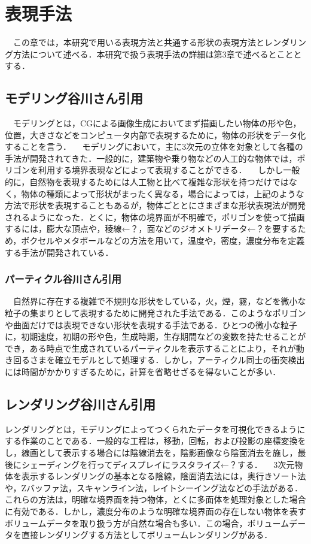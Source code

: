 \documentclass[11pt]{jreport}
\begin{document}
\chapter{表現手法}
　この章では，本研究で用いる表現方法と共通する形状の表現方法とレンダリング方法について述べる．本研究で扱う表現手法の詳細は第3章で述べるとこととする．

\section{モデリング谷川さん引用}
　モデリングとは，CGによる画像生成においてまず描画したい物体の形や色，位置，大きさなどをコンピュータ内部で表現するために，物体の形状をデータ化することを言う．
　モデリングにおいて，主に3次元の立体を対象として各種の手法が開発されてきた．一般的に，建築物や乗り物などの人工的な物体では，ポリゴンを利用する境界表現などによって表現することができる．
　しかし一般的に，自然物を表現するためには人工物と比べて複雑な形状を持つだけではなく，物体の種類によって形状がまったく異なる，場合によっては，上記のような方法で形状を表現することもあるが，物体ごととにさまざまな形状表現法が開発されるようになった．とくに，物体の境界面が不明確で，ポリゴンを使って描画するには，膨大な頂点や，稜線←？，面などのジオメトリデータ←？を要するため，ボクセルやメタボールなどの方法を用いて，温度や，密度，濃度分布を定義する手法が開発されている．

\subsection{パーティクル谷川さん引用}
　自然界に存在する複雑で不規則な形状をしている，火，煙，霧，などを微小な粒子の集まりとして表現するために開発された手法である．このようなポリゴンや曲面だけでは表現できない形状を表現する手法である．ひとつの微小な粒子に，初期速度，初期の形や色，生成時期，生存期間などの変数を持たせることができ，ある時点で生成されているパーティクルを表示することにより，それが動き回るさまを確立モデルとして処理する．しかし，アーティクル同士の衝突検出には時間がかかりすぎるために，計算を省略せざるを得ないことが多い．

\section{レンダリング谷川さん引用}
レンダリングとは，モデリングによってつくられたデータを可視化できるようにする作業のことである．一般的な工程は，移動，回転，および投影の座標変換をし，線画として表示する場合には陰線消去を，陰影画像なら陰面消去を施し，最後にシェーディングを行ってディスプレイにラスタライズ←？する．
　3次元物体を表示するレンダリングの基本となる陰線，陰面消去法には，奥行きソート法や，Zバッファ法，スキャンライン法，レイトシーイング法などの手法がある．これらの方法は，明確な境界面を持つ物体，とくに多面体を処理対象とした場合に有効である．しかし，濃度分布のような明確な境界面の存在しない物体を表すボリュームデータを取り扱う方が自然な場合も多い．この場合，ボリュームデータを直接レンダリングする方法としてボリュームレンダリングがある．
\end{document}
